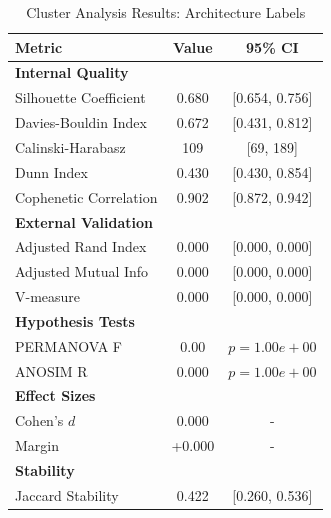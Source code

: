 
\begin{table}[h!]
\centering
\caption{Cluster Analysis Results: Architecture Labels}
\label{tab:cluster_architecture}
\begin{tabular}{lcc}
\toprule
Metric & Value & 95\% CI \\
\midrule
\multicolumn{3}{l}{\textbf{Internal Quality}} \\
Silhouette Coefficient & 0.680 & [0.654, 0.756] \\
Davies-Bouldin Index & 0.672 & [0.431, 0.812] \\
Calinski-Harabasz & 109 & [69, 189] \\
Dunn Index & 0.430 & [0.430, 0.854] \\
Cophenetic Correlation & 0.902 & [0.872, 0.942] \\
\midrule
\multicolumn{3}{l}{\textbf{External Validation}} \\
Adjusted Rand Index & 0.000 & [0.000, 0.000] \\
Adjusted Mutual Info & 0.000 & [0.000, 0.000] \\
V-measure & 0.000 & [0.000, 0.000] \\
\midrule
\multicolumn{3}{l}{\textbf{Hypothesis Tests}} \\
PERMANOVA F & 0.00 & $p = 1.00e+00$ \\
ANOSIM R & 0.000 & $p = 1.00e+00$ \\
\midrule
\multicolumn{3}{l}{\textbf{Effect Sizes}} \\
Cohen's $d$ & 0.000 & - \\
Margin & +0.000 & - \\
\midrule
\multicolumn{3}{l}{\textbf{Stability}} \\
Jaccard Stability & 0.422 & [0.260, 0.536] \\
\bottomrule
\end{tabular}
\end{table}
